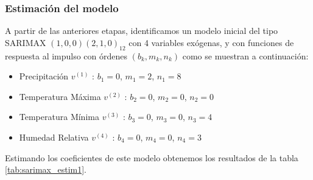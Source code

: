 \documentclass[12pt,oneside]{book}\usepackage[]{graphicx}\usepackage[]{color}
\theoremstyle{definition} %
\begin{document}


\subsubsection{Estimación del modelo}




A partir de las anteriores etapas, identificamos un modelo inicial del tipo SARIMAX $(1,0,0)(2,1,0)_{12}$ con 4 variables exógenas, y con funciones de respuesta al impulso con órdenes $(b_k,m_k,n_k)$ como se muestran a continuación:







\begin{itemize}
\item Precipitación $v^{(1)}$ : $b_1= 0$, $m_1=2$, $n_1=8$
\item Temperatura Máxima $v^{(2)}$ : $b_2= 0$, $m_2=0$, $n_2=0$
\item Temperatura Mínima $v^{(3)}$ : $b_3= 0$, $m_3=0$, $n_3=4$
\item Humedad Relativa $v^{(4)}$ : $b_4= 0$, $m_4=0$, $n_4=3$
\end{itemize}


Estimando los coeficientes de este modelo obtenemos los resultados de la tabla \ref{tab:sarimax_estim1}.
\end{document}
